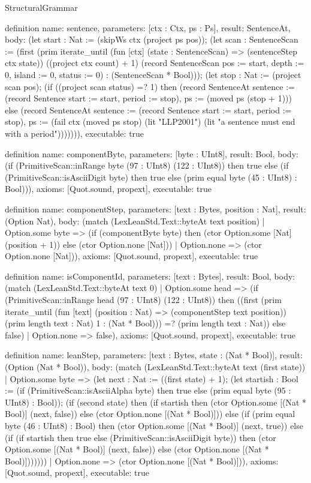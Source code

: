 \begin{lexlean}{StructuralGrammar}
\begin{semanticmodule}
{{definition{
  name: sentence,
  parameters: [ctx : Ctx, ps : Ps],
  result: SentenceAt,
  body: (let start : Nat := (skipWs ctx (project ps pos)); (let scan : SentenceScan := (first (prim iterate_until (fun [ctx] (state : SentenceScan) => (sentenceStep ctx state)) ((project ctx count) + 1) (record SentenceScan {pos := start, depth := 0, island := 0, status := 0}) : (SentenceScan * Bool))); (let stop : Nat := (project scan pos); (if ((project scan status) =? 1) then (record SentenceAt {sentence := (record Sentence {start := start, period := stop}), ps := (moved ps (stop + 1))}) else (record SentenceAt {sentence := (record Sentence {start := start, period := stop}), ps := (fail ctx (moved ps stop) (lit "LLP2001") (lit "a sentence must end with a period"))}))))),
  executable: true
}

definition{
  name: componentByte,
  parameters: [byte : UInt8],
  result: Bool,
  body: (if (PrimitiveScan::inRange byte (97 : UInt8) (122 : UInt8)) then true else (if (PrimitiveScan::isAsciiDigit byte) then true else (prim equal byte (45 : UInt8) : Bool))),
  axioms: [Quot.sound, propext],
  executable: true
}

definition{
  name: componentStep,
  parameters: [text : Bytes, position : Nat],
  result: (Option Nat),
  body: (match (LexLeanStd.Text::byteAt text position)
    | Option.some byte => (if (componentByte byte) then (ctor Option.some [Nat] (position + 1)) else (ctor Option.none [Nat]))
    | Option.none => (ctor Option.none [Nat])),
  axioms: [Quot.sound, propext],
  executable: true
}

definition{
  name: isComponentId,
  parameters: [text : Bytes],
  result: Bool,
  body: (match (LexLeanStd.Text::byteAt text 0)
    | Option.some head => (if (PrimitiveScan::inRange head (97 : UInt8) (122 : UInt8)) then ((first (prim iterate_until (fun [text] (position : Nat) => (componentStep text position)) (prim length text : Nat) 1 : (Nat * Bool))) =? (prim length text : Nat)) else false)
    | Option.none => false),
  axioms: [Quot.sound, propext],
  executable: true
}

definition{
  name: leanStep,
  parameters: [text : Bytes, state : (Nat * Bool)],
  result: (Option (Nat * Bool)),
  body: (match (LexLeanStd.Text::byteAt text (first state))
    | Option.some byte => (let next : Nat := ((first state) + 1); (let startish : Bool := (if (PrimitiveScan::isAsciiAlpha byte) then true else (prim equal byte (95 : UInt8) : Bool)); (if (second state) then (if startish then (ctor Option.some [(Nat * Bool)] (next, false)) else (ctor Option.none [(Nat * Bool)])) else (if (prim equal byte (46 : UInt8) : Bool) then (ctor Option.some [(Nat * Bool)] (next, true)) else (if (if startish then true else (PrimitiveScan::isAsciiDigit byte)) then (ctor Option.some [(Nat * Bool)] (next, false)) else (ctor Option.none [(Nat * Bool)]))))))
    | Option.none => (ctor Option.none [(Nat * Bool)])),
  axioms: [Quot.sound, propext],
  executable: true
}

}}
\end{semanticmodule}
\end{lexlean}
